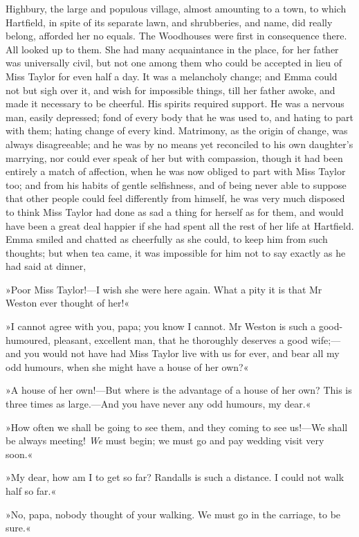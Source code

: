 Highbury, the large and populous village, almost amounting to a town, to which Hartfield, in spite of its separate lawn, and shrubberies, and name, did really belong, afforded her no equals. The Woodhouses were first in consequence there. All looked up to them. She had many acquaintance in the place, for her father was universally civil, but not one among them who could be accepted in lieu of Miss Taylor for even half a day. It was a melancholy change; and Emma could not but sigh over it, and wish for impossible things, till her father awoke, and made it necessary to be cheerful. His spirits required support. He was a nervous man, easily depressed; fond of every body that he was used to, and hating to part with them; hating change of every kind. Matrimony, as the origin of change, was always disagreeable; and he was by no means yet reconciled to his own daughter's marrying, nor could ever speak of her but with compassion, though it had been entirely a match of affection, when he was now obliged to part with Miss Taylor too; and from his habits of gentle selfishness, and of being never able to suppose that other people could feel differently from himself, he was very much disposed to think Miss Taylor had done as sad a thing for herself as for them, and would have been a great deal happier if she had spent all the rest of her life at Hartfield. Emma smiled and chatted as cheerfully as she could, to keep him from such thoughts; but when tea came, it was impossible for him not to say exactly as he had said at dinner,

»Poor Miss Taylor!—I wish she were here again. What a pity it is that Mr Weston ever thought of her!«

»I cannot agree with you, papa; you know I cannot. Mr Weston is such a good-humoured, pleasant, excellent man, that he thoroughly deserves a good wife;—and you would not have had Miss Taylor live with us for ever, and bear all my odd humours, when she might have a house of her own?«

»A house of her own!—But where is the advantage of a house of her own? This is three times as large.—And you have never any odd humours, my dear.«

»How often we shall be going to see them, and they coming to see us!—We shall be always meeting! \textit{We} must begin; we must go and pay wedding visit very soon.«

»My dear, how am I to get so far? Randalls is such a distance. I could not walk half so far.«

»No, papa, nobody thought of your walking. We must go in the carriage, to be sure.«

